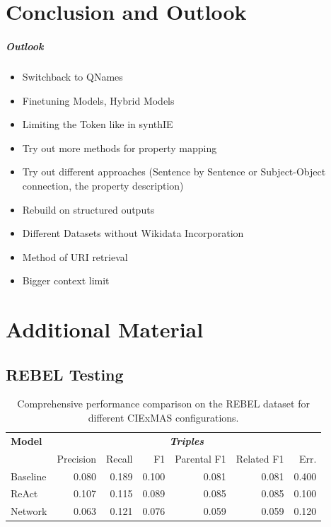 \documentclass[a4paper,oneside,bibliography=totoc]{scrbook}
\begin{document}
\chapter{Conclusion and Outlook}
\label{ch:conclusion_outlook}

\paragraph{Outlook}

\begin{itemize}
  \item Switchback to QNames
  \item Finetuning Models, Hybrid Models
  \item Limiting the Token like in synthIE
  \item Try out more methods for property mapping
  \item Try out different approaches (Sentence by Sentence or Subject-Object connection, the property description)
  \item Rebuild on structured outputs
  \item Different Datasets without Wikidata Incorporation
  \item Method of URI retrieval
  \item Bigger context limit
\end{itemize}




\appendix
\chapter{Additional Material}
\label{ch:additional_material}

\section{REBEL Testing}
\label{sec:rebel_testing}

\begin{table}[h]
  \centering
  \begin{tabular}{l|rrrrrr}
    \toprule
    \textbf{Model} & \multicolumn{6}{c}{\textit{\textbf{Triples}}}                                                     \\
                   & Precision                                     & Recall & F1    & Parental F1 & Related F1 & Err.  \\
    \midrule
    Baseline       & 0.080                                         & 0.189  & 0.100 & 0.081       & 0.081      & 0.400 \\
    ReAct          & 0.107                                         & 0.115  & 0.089 & 0.085       & 0.085      & 0.100 \\
    Network        & 0.063                                         & 0.121  & 0.076 & 0.059       & 0.059      & 0.120 \\
    \bottomrule
  \end{tabular}
  \caption{Comprehensive performance comparison on the REBEL dataset for different CIExMAS configurations.}
  \label{tab:rebel_comprehensive_results}
\end{table}
\end{document}

